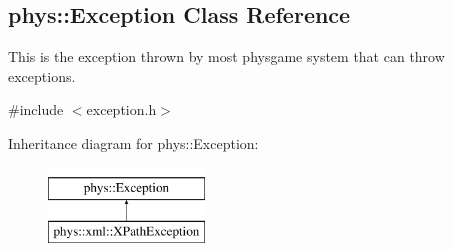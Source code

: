 \hypertarget{classphys_1_1Exception}{
\subsection{phys::Exception Class Reference}
\label{classphys_1_1Exception}
}


This is the exception thrown by most physgame system that can throw exceptions.  




{\ttfamily \#include $<$exception.h$>$}

Inheritance diagram for phys::Exception:\begin{figure}[H]
\begin{center}
\leavevmode
\includegraphics[height=2.000000cm]{classphys_1_1Exception}
\end{center}
\end{figure}
